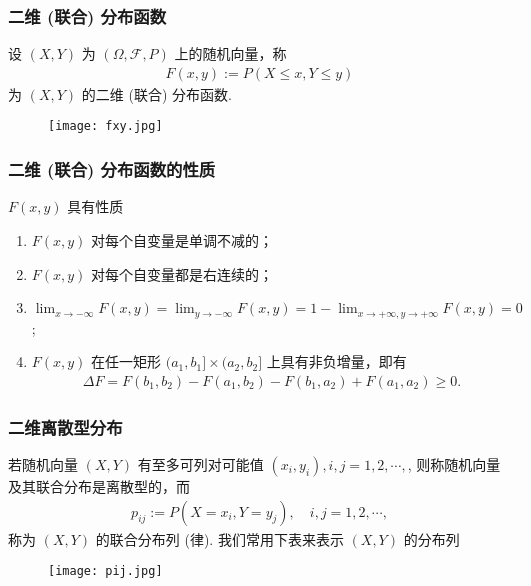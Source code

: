 \begin{frame}
  \frametitle{二维 (联合) 分布函数}
  \begin{defi}
    设 $(X,Y)$ 为 $(\Omega,\mathcal{F},P)$ 上的随机向量，称
    \begin{eqnarray*}
      F(x,y):=P(X\le x, Y\le y)
    \end{eqnarray*}
    为 $(X,Y)$ 的二维 (联合) 分布函数.
  \end{defi}
  \begin{figure}[h]
    \centering
    \texttt{[image: fxy.jpg]}
  \end{figure}

\end{frame}
\begin{frame}
  \frametitle{二维 (联合) 分布函数的性质}
  \begin{thm}
    $F (x,y)$ 具有性质
    \begin{enumerate}[<+-|alert@+>]
    \item $F (x,y)$ 对每个自变量是单调不减的；
    \item $F (x,y)$ 对每个自变量都是右连续的；
    \item{\small $\lim_{x\rightarrow -\infty}F(x,y)=\lim_{y\rightarrow -\infty}F(x,y)=1-\lim_{x\rightarrow +\infty, y\rightarrow +\infty }F(x,y)=0$;}
    \item $F (x,y)$ 在任一矩形 $(a_1,b_1]\times (a_2,b_2]$ 上具有非负增量，即有
      \begin{eqnarray*}
        \Delta F=F(b_1,b_2)-F(a_1,b_2)-F(b_1,a_2)+F(a_1,a_2)\ge 0.
      \end{eqnarray*}

    \end{enumerate}

  \end{thm}
\end{frame}
\begin{frame}
  \frametitle{二维离散型分布}
  \begin{defi}
    若随机向量 $(X,Y)$ 有至多可列对可能值 $(x_i,y_i), i,j=1,2,\cdots,$, 则称随机向量及其联合分布是离散型的，而
    \begin{eqnarray*}
      p_{ij}:=P(X=x_i,Y=y_j), \quad i, j=1,2,\cdots,
    \end{eqnarray*}
    称为 $(X,Y)$ 的联合分布列 (律). 我们常用下表来表示 $(X,Y)$ 的分布列
  \end{defi}
  \begin{figure}[h]
    \centering
    \texttt{[image: pij.jpg]}
  \end{figure}

\end{frame}
